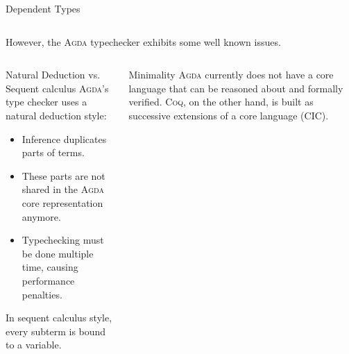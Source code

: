 \documentclass[final, xcolor=svgnames]{beamer}
\newcommand{\coq}{\textsc{Coq}\xspace}
\newcommand{\agda}{\textsc{Agda}\xspace}
\begin{document}
\begin{frame}[shrink]
\begin{block}{Dependent Types}
\begin{columns}[t]
      However, the \agda typechecker exhibits some well known issues.
      
    \end{columns}
  \end{block}
  \vspace{2cm}
  \begin{columns}[T]
    \begin{block}{Natural Deduction vs. Sequent calculus}
      \agda's type checker uses a natural deduction style:
      \begin{itemize}
      \item Inference duplicates parts of terms.
      \item These parts are not shared in the \agda core representation anymore.
      \item Typechecking must be done multiple time, causing performance penalties.
      \end{itemize}
      In sequent calculus style, every subterm is bound to a variable.
      \begin{figure}
        \vspace{30pt}
        \centering
      \end{figure}
    \end{block}
    \begin{block}{Minimality}
      \agda currently does not have a core language that can be reasoned about and formally verified. \coq, on the other hand, is built as successive extensions of a core language (CIC).


\end{block}
\end{columns}
\end{frame}
\end{document}
